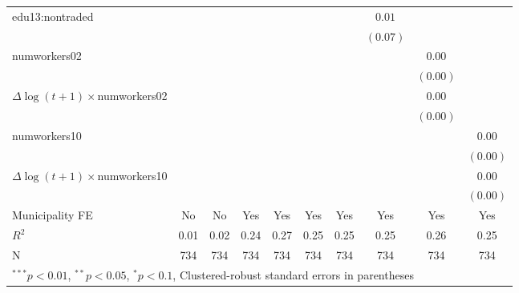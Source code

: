 \begin{tabular}{l c c c c c c c c c }
edu13:nontraded      &              &               &              &               &              &              & $0.01$       &               &              \\
                     &              &               &              &               &              &              & $(0.07)$     &               &              \\
numworkers02         &              &               &              &               &              &              &              & $0.00$        &              \\
                     &              &               &              &               &              &              &              & $(0.00)$      &              \\
$\Delta \log(t+1) \times$numworkers02 &              &               &              &               &              &              &              & $0.00$        &              \\
                     &              &               &              &               &              &              &              & $(0.00)$      &              \\
numworkers10         &              &               &              &               &              &              &              &               & $0.00$       \\
                     &              &               &              &               &              &              &              &               & $(0.00)$     \\
$\Delta \log(t+1) \times$numworkers10 &              &               &              &               &              &              &              &               & $0.00$       \\
                     &              &               &              &               &              &              &              &               & $(0.00)$     \\
\hline
Municipality FE     &No&No&Yes&Yes&Yes&Yes&Yes&Yes&Yes\\ 
\hline
$R^2$                & 0.01         & 0.02          & 0.24         & 0.27          & 0.25         & 0.25         & 0.25         & 0.26          & 0.25         \\
N                    & 734          & 734           & 734          & 734           & 734          & 734          & 734          & 734           & 734          \\
\hline
\multicolumn{10}{l}{\scriptsize{$^{***}p<0.01$, $^{**}p<0.05$, $^*p<0.1$, Clustered-robust standard errors in parentheses}}
\end{tabular}
